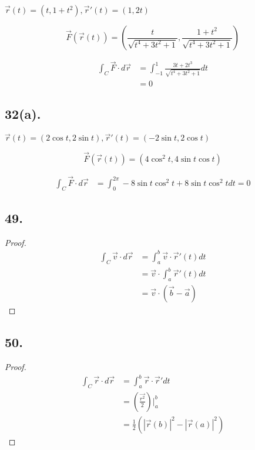 \documentclass{article}
\begin{document}
  $\overrightarrow{r}(t) = (t, 1 + t^2), \overrightarrow{r}'(t) = (1, 2t)$

  $$\overrightarrow{F}(\overrightarrow{r}(t)) = (\frac{t}{\sqrt{t^4+3t^2+1}}, \frac{1 + t^2}{\sqrt{t^4 + 3t^2 + 1}})$$

  $$\begin{aligned}
    \int_C \overrightarrow{F} \cdot d\overrightarrow{r} &= \int_{-1}^1 \frac{3t + 2t^3}{\sqrt{t^4 + 3t^2 + 1}} dt \\
    &= 0
  \end{aligned}$$

  \subsection*{32(a). }

  $\overrightarrow{r}(t) = (2\cos t, 2 \sin t), \overrightarrow{r}'(t) = (-2\sin t, 2\cos t)$

  $$\overrightarrow{F}(\overrightarrow{r}(t)) = (4\cos^2 t, 4\sin t \cos t)$$

  $$\begin{aligned}
    \int_C \overrightarrow{F} \cdot d\overrightarrow{r} &= \int_0^{2\pi} -8\sin t \cos^2 t + 8 \sin t \cos^2 t dt = 0
  \end{aligned}$$

  \subsection*{49. }

  \begin{proof}
    $$\begin{aligned}
      \int_C \overrightarrow{v} \cdot d\overrightarrow{r} &= \int_a^b \overrightarrow{v} \cdot \overrightarrow{r}'(t) dt \\
      &= \overrightarrow{v} \cdot \int_a^b \overrightarrow{r}'(t) dt \\
      &= \overrightarrow{v} \cdot (\overrightarrow{b} - \overrightarrow{a})
    \end{aligned}$$
  \end{proof}

  \subsection*{50. }

  \begin{proof}
    $$\begin{aligned}
      \int_C \overrightarrow{r} \cdot d\overrightarrow{r} &= \int_a^b \overrightarrow{r} \cdot \overrightarrow{r}' dt \\
      &= (\frac{\overrightarrow{r^2}}{2})\biggl|_a^b \\
      &= \frac 1 2 (|\overrightarrow{r}(b)|^2 - |\overrightarrow{r}(a)|^2)
    \end{aligned}$$
  \end{proof}
  
\end{document}
